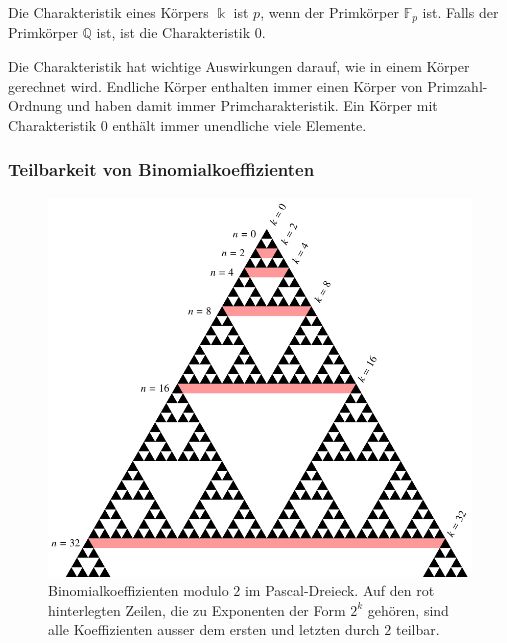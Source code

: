 \begin{definition}
Die Charakteristik eines Körpers $\Bbbk$ ist $p$, wenn der Primkörper
$\mathbb{F}_p$ ist.
Falls der Primkörper $\mathbb{Q}$ ist, ist die Charakteristik $0$.
\end{definition}

Die Charakteristik hat wichtige Auswirkungen darauf, wie in einem Körper
gerechnet wird.
Endliche Körper enthalten immer einen Körper von Primzahl-Ordnung und
haben damit immer Primcharakteristik.
Ein Körper mit Charakteristik $0$ enthält immer unendliche viele
Elemente.

\subsubsection{Teilbarkeit von Binomialkoeffizienten}
\begin{figure}
\centering
\includegraphics{chapters/30-endlichekoerper/images/binomial2.pdf}
\caption{Binomialkoeffizienten modulo $2$ im Pascal-Dreieck.
Auf den rot hinterlegten Zeilen, die zu Exponenten der Form $2^k$ gehören,
sind alle Koeffizienten ausser dem ersten und letzten durch $2$ teilbar.
\label{buch:endliche-koerper:fig:binomial2}}
\end{figure}
\bgroup

